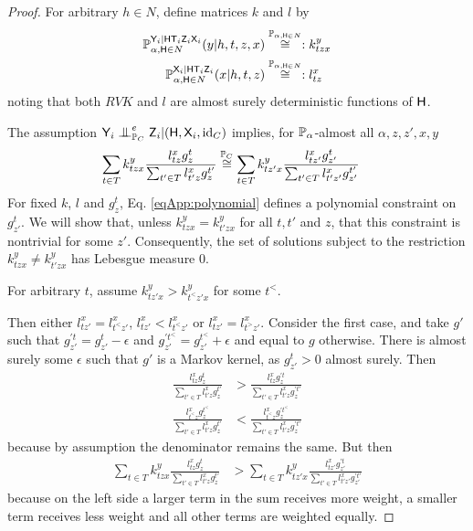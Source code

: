 \begin{proof}
For arbitrary $h\in N$, define matrices $k$ and $l$ by
\begin{align}
    \mathbb{P}_{\alpha,\mathsf{H}\in N}^{\mathsf{Y}_i|\mathsf{H}\mathsf{T}_i\mathsf{Z}_i\mathsf{X}_i}(y|h,t,z,x)&\overset{\mathbb{P}_{\alpha,\mathsf{H}\in N}}{\cong}: k^y_{tzx}\\
    \mathbb{P}_{\alpha,\mathsf{H}\in N}^{\mathsf{X}_i|\mathsf{H}\mathsf{T}_i\mathsf{Z}_i}(x|h,t,z)&\overset{\mathbb{P}_{\alpha,\mathsf{H}\in N}}{\cong}: l^x_{tz}
\end{align}
noting that both $RV{K}$ and $l$ are almost surely deterministic functions of $\mathsf{H}$.

The assumption $\RV{Y}_i\CI^e_{\prob{P}_C} \RV{Z}_i|(\RV{H},\RV{X}_i,\text{id}_C)$ implies, for $\mathbb{P}_\alpha$-almost all $\alpha,z,z',x,y$
\begin{align}
    \sum_{t\in T} k^y_{tzx}\frac{l^x_{tz}g^t_z}{\sum_{t'\in T}l^x_{t'z}g^{t'}_z}&\overset{\mathbb{P}_C}{\cong} \sum_{t\in T} k^y_{tz'x}\frac{l^x_{tz'}g^t_{z'}}{\sum_{t'\in T}l^x_{t'z'}g^{t'}_{z'}}\label{eqApp:polynomial}
\end{align}
For fixed $k$, $l$ and $g^t_z$, Eq. \eqref{eqApp:polynomial} defines a polynomial constraint on $g^t_{z'}$. We will show that, unless $k^y_{tzx}= k^y_{t'zx}$ for all $t,t'$ and $z$, that this constraint is nontrivial for some $z'$. Consequently, the set of solutions subject to the restriction $k^y_{tzx}\neq k^y_{t'zx}$ has Lebesgue measure 0.

For arbitrary $t$, assume $k^y_{tz'x} > k^y_{t^<z'x}$ for some $t^<$. 

Then either $l^x_{tz'}=l^x_{t^<z'}$, $l^x_{tz'}< l^x_{t^<z'}$ or $l^x_{tz'}=l^x_{t^>z'}$. Consider the first case, and take $g'$ such that $g^{\prime t}_{z'}=g^{t}_{z'}-\epsilon$ and $g^{\prime t^<}_{z'}=g^{t^<}_{z'}+\epsilon$ and equal to $g$ otherwise. There is almost surely some $\epsilon$ such that $g'$ is a Markov kernel, as $g^{t}_{z'}>0$ almost surely. Then
\begin{align}
    \frac{l^x_{tz}g^t_z}{\sum_{t'\in T}l^x_{t'z}g^{t'}_z} &> \frac{l^x_{tz}g^{\prime t}_z}{\sum_{t'\in T}l^x_{t'z}g^{\prime t'}_z}\\
    \frac{l^x_{t^<z}g^{t^<}_z}{\sum_{t'\in T}l^x_{t'z}g^{t'}_z} &< \frac{l^x_{t^<z}g^{\prime t^<}_z}{\sum_{t'\in T}l^x_{t'z}g^{\prime t'}_z}
\end{align}
because by assumption the denominator remains the same. But then
\begin{align}
    \sum_{t\in T} k^y_{tzx}\frac{l^x_{tz}g^t_z}{\sum_{t'\in T}l^x_{t'z}g^{t'}_z}&> \sum_{t\in T} k^y_{tz'x}\frac{l^x_{tz'}g^{\prime t}_{z'}}{\sum_{t'\in T}l^x_{t'z'}g^{\prime t'}_{z'}}\label{eqApp:inequality}
\end{align}
because on the left side a larger term in the sum receives more weight, a smaller term receives less weight and all other terms are weighted equally.


\end{proof}
